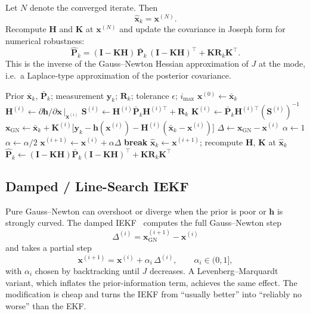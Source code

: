 \documentclass[11pt]{article}
\newcommand{\x}{\bm{x}}
\newcommand{\y}{\bm{y}}
\newcommand{\meas}{\bm{h}}
\newcommand{\Hm}{\bm{H}}
\newcommand{\K}{\bm{K}}
\newcommand{\Pm}{\bm{P}}
\newcommand{\R}{\bm{R}}
\newcommand{\Sm}{\bm{S}}
\newcommand{\I}{\bm{I}}
\newcommand{\xbar}{\bar{\x}}
\newcommand{\xhat}{\hat{\x}}
\newcommand{\Pbar}{\bar{\Pm}}
\newcommand{\Phat}{\hat{\Pm}}
\newcommand{\iter}[1]{^{(#1)}}
\begin{document}
Let $N$ denote the converged iterate. Then
\begin{equation}
  \xhat_k = \x\iter{N}.
\end{equation}
Recompute $\Hm$ and $\K$ at $\x\iter{N}$ and update the covariance in Joseph form for
numerical robustness:
\begin{equation}
  \Phat_k = (\I - \K\Hm)\,\Pbar_k\,(\I - \K\Hm)^\top + \K\R_k\K^\top .
  \label{eq:joseph}
\end{equation}
This is the inverse of the Gauss--Newton Hessian approximation of $J$ at the mode, i.e.\ a
Laplace-type approximation of the posterior covariance.

\begin{algorithm}[htbp]
\caption{IEKF measurement update (with optional damping)}
\label{alg:iekf}
\begin{algorithmic}[1]
\Require Prior $\xbar_k$, $\Pbar_k$; measurement $\y_k$; $\R_k$; tolerance $\epsilon$; $i_{\max}$
\State $\x\iter{0} \gets \xbar_k$
  \State $\Hm\iter{i} \gets \partial\meas/\partial\x\,|_{\x\iter{i}}$
  \State $\Sm\iter{i} \gets \Hm\iter{i}\Pbar_k\Hm^{(i)\top} + \R_k$
  \State $\K\iter{i} \gets \Pbar_k\Hm^{(i)\top}(\Sm\iter{i})^{-1}$
  \State $\x_{\mathrm{GN}} \gets \xbar_k + \K\iter{i}\bigl[\y_k - \meas(\x\iter{i}) - \Hm\iter{i}(\xbar_k - \x\iter{i})\bigr]$
  \State $\Delta \gets \x_{\mathrm{GN}} - \x\iter{i}$
  \State $\alpha \gets 1$
  \While{$J(\x\iter{i} + \alpha\Delta) > J(\x\iter{i})$ \textbf{and} $\alpha > \alpha_{\min}$} 
    \State $\alpha \gets \alpha/2$
  \EndWhile
  \State $\x\iter{i+1} \gets \x\iter{i} + \alpha\Delta$
  \If{$\Delta^\top\Pbar_k^{-1}\Delta < \epsilon$} \textbf{break} \EndIf
\EndFor
\State $\xhat_k \gets \x\iter{i+1}$; recompute $\Hm$, $\K$ at $\xhat_k$
\State $\Phat_k \gets (\I - \K\Hm)\Pbar_k(\I - \K\Hm)^\top + \K\R_k\K^\top$
\end{algorithmic}
\end{algorithm}

\subsection{Damped / Line-Search IEKF}

Pure Gauss--Newton can overshoot or diverge when the prior is poor or $\meas$ is strongly
curved. The damped IEKF~\cite{skoglund2015} computes the full Gauss--Newton step
\begin{equation}
  \Delta\iter{i} = \x_{\mathrm{GN}}\iter{i+1} - \x\iter{i}
\end{equation}
and takes a partial step
\begin{equation}
  \x\iter{i+1} = \x\iter{i} + \alpha_i\,\Delta\iter{i}, \qquad \alpha_i \in (0, 1],
\end{equation}
with $\alpha_i$ chosen by backtracking until $J$ decreases. A Levenberg--Marquardt variant,
which inflates the prior-information term, achieves the same effect. The modification is cheap
and turns the IEKF from ``usually better'' into ``reliably no worse'' than the EKF.
\end{document}
